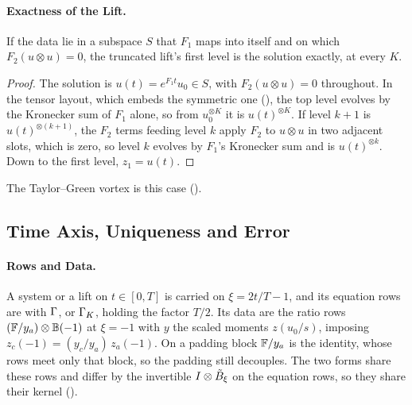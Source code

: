 \paragraph{Exactness of the Lift.}
\begin{proposition}
\label{prop:exact-lift}
If the data lie in a subspace $S$ that $F_1$ maps into itself and on which $F_2(u\otimes u)=0$, the truncated lift's first level is the solution exactly, at every $K$.
\end{proposition}
\begin{proof}
The solution is $u(t)=e^{F_1t}u_0\in S$, with $F_2(u\otimes u)=0$ throughout. In the tensor layout, which embeds the symmetric one (), the top level evolves by the Kronecker sum of $F_1$ alone, so from $u_0^{\otimes K}$ it is $u(t)^{\otimes K}$. If level $k+1$ is $u(t)^{\otimes(k+1)}$, the $F_2$ terms feeding level $k$ apply $F_2$ to $u\otimes u$ in two adjacent slots, which is zero, so level $k$ evolves by $F_1$'s Kronecker sum and is $u(t)^{\otimes k}$. Down to the first level, $z_1=u(t)$.
\end{proof}
The Taylor--Green vortex is this case ().

\subsection{Time Axis, Uniqueness and Error}
\label{app:carleman-spacetime}

\paragraph{Rows and Data.} A system or a lift on $t\in[0,T]$ is carried on $\xi=2t/T-1$, and its equation rows are  with $\Gamma$, or $\Gamma_K$, holding the factor $T/2$. Its data are the ratio rows $(\mathbb{F}/y_a)\otimes\mathbb{B}(-1)$ at $\xi=-1$ with $y$ the scaled moments $z(u_0/s)$, imposing $z_c(-1)=(y_c/y_a)\,z_a(-1)$. On a padding block $\mathbb{F}/y_a$ is the identity, whose rows meet only that block, so the padding still decouples. The two forms share these rows and differ by the invertible $I\otimes\tilde{B}_\xi$ on the equation rows, so they share their kernel ().

